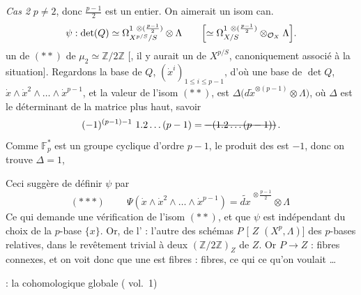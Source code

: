 \documentclass[11pt,a4paper]{article}
\begin{document}
\emph{Cas 2} $p\neq 2$, donc $\frac{p-1}{2}$ est un entier. On aimerait
 un isom can.
\[
  \psi : \det(Q) \simeq
  \Omega^{1\ \otimes(\frac{p-1}{2})}_{X^{p/S}/S}\otimes\Lambda
  \qquad\Bigl[\simeq \Omega^{1\ \otimes(\frac{p-1}{2})}_{X/S}
  \otimes_{\mathcal{O}_X}\Lambda\Bigr].
\]
 un  de $(**)$ \ill{} de
$\mu_2\simeq\mathbb{Z}/2\mathbb{Z}$ [, il y aurait un
 \ill{} de $X^{p/S}$, canoniquement associé à la
situation]. Regardons la base de $Q$, $(\dot{x}^i)_{1\leq i\leq p-1}$,
 d'où une base de $\det Q$,
$\dot{x}\wedge\dot{x}^2\wedge\dots\wedge\dot{x}^{p-1}$, et la valeur de
l'isom $(**)$, est
$\Delta\bigl(d\tilde{x}^{\otimes(p-1)}\otimes\Lambda\bigr)$, où $\Delta$ est le
déterminant de la matrice  plus haut, savoir
\[
  (-1)^{(p-1)-1}\ 1.2\dots(p-1) = \text{\struck{$-(1.2\dots(p-1))$}}\,.
\]
Comme $\mathbb{F}_p^*$ est un groupe cyclique d'ordre  $p-1$, le
produit des  est $-1$, donc on trouve $\Delta = 1$,

Ceci suggère  de définir $\psi$ par
\[
  (***)\qquad \boxed{\ \Psi(\dot{x}\wedge\dot{x}^2\wedge\dots\wedge\dot{x}^{p-1})
  = \widetilde{dx}^{\,\otimes\frac{p-1}{2}}\otimes\Lambda\ }
\]
Ce qui demande une vérification  de l'isom $(**)$, et
 que $\psi$ est indépendant du choix de la $p$-base
$\{x\}$. 
Or, \ill{} de l'\ill{} : l'autre \ill{}  \ill{}
  des schémas
$P$ [\ill{} $Z$ \ill{} $(X^{p}, \Lambda)$] \ill{} des $p$-bases
relatives, dans le revêtement trivial à deux 
$(\mathbb{Z}/2\mathbb{Z})_Z$ de $Z$. \struck{\ill{}} Or \struck{\ill{}}
$P \to Z$ \ill{} : fibres connexes, et on voit donc que
 \ill{} une  est
 \ill{} fibres : fibres, ce qui  ce qu'on
voulait …

 : la  cohomologique globale
( \ill{}  vol.~1)
\end{document}
